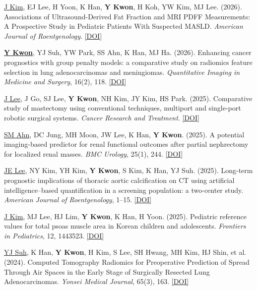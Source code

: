 \documentclass[10pt,a4paper]{article}
\newenvironment{publist}{%
    \renewcommand{\labelenumi}{\color{headercolor}[\theenumi]}%
    \begin{etaremune}[itemsep=0.3em]%
}{\end{etaremune}}
\begin{document}
\begin{publist}
    \item \underline{J Kim}, EJ Lee, H Yoon, K Han, \textbf{Y Kwon}, H Koh, YW Kim, MJ Lee. (2026).
    Associations of Ultrasound-Derived Fat Fraction and MRI PDFF Measurements: A Prospective Study in Pediatric Patients With Suspected MASLD.
    \textit{American Journal of Roentgenology}. \href{https://doi.org/10.2214/AJR.25.34230}{[DOI]}

    \item \underline{\textbf{Y Kwon}}, YJ Suh, YW Park, SS Ahn, K Han, MJ Ha. (2026).
    Enhancing cancer prognostics with group penalty models: a comparative study on radiomics feature selection in lung adenocarcinomas and meningiomas.
    \textit{Quantitative Imaging in Medicine and Surgery}, 16(2), 118. \href{https://doi.org/10.21037/qims-2025-1951}{[DOI]}

    \item \underline{J Lee}, J Go, SJ Lee, \textbf{Y Kwon}, NH Kim, JY Kim, HS Park. (2025).
    Comparative study of mastectomy using conventional techniques, multiport and single-port robotic surgical systems.
    \textit{Cancer Research and Treatment}. \href{https://doi.org/10.4143/crt.2025.115}{[DOI]}

    \item \underline{SM Ahn}, DC Jung, MH Moon, JW Lee, K Han, \textbf{Y Kwon}. (2025).
    A potential imaging-based predictor for renal functional outcomes after partial nephrectomy for localized renal masses.
    \textit{BMC Urology}, 25(1), 244. \href{https://doi.org/10.1186/s12894-025-01907-3}{[DOI]}

    \item \underline{JE Lee}, NY Kim, YH Kim, \textbf{Y Kwon}, S Kim, K Han, YJ Suh. (2025).
    Long-term prognostic implications of thoracic aortic calcification on CT using artificial intelligence–based quantification in a screening population: a two-center study.
    \textit{American Journal of Roentgenology}, 1--15. \href{https://doi.org/10.2214/AJR.25.32697}{[DOI]}

    \item \underline{J Kim}, MJ Lee, HJ Lim, \textbf{Y Kwon}, K Han, H Yoon. (2025).
    Pediatric reference values for total psoas muscle area in Korean children and adolescents.
    \textit{Frontiers in Pediatrics}, 12, 1443523. \href{https://doi.org/10.3389/fped.2024.1443523}{[DOI]}

    \item \underline{YJ Suh}, K Han, \textbf{Y Kwon}, H Kim, S Lee, SH Hwang, MH Kim, HJ Shin, et al. (2024).
    Computed Tomography Radiomics for Preoperative Prediction of Spread Through Air Spaces in the Early Stage of Surgically Resected Lung Adenocarcinomas.
    \textit{Yonsei Medical Journal}, 65(3), 163. \href{https://doi.org/10.3349/ymj.2023.0368}{[DOI]}


\end{publist}
\end{document}
